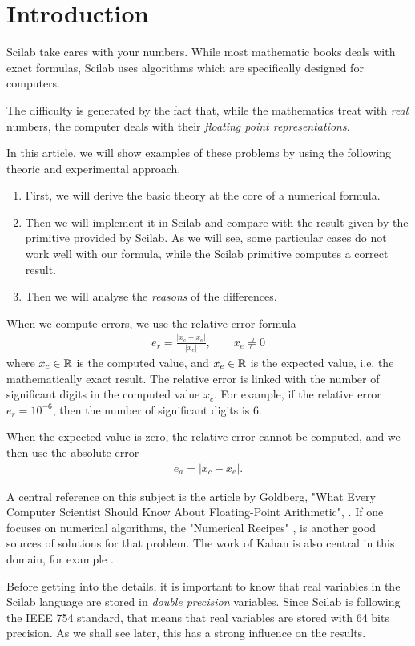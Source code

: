 \section{Introduction}

Scilab take cares with your numbers.
While most mathematic books deals with exact formulas, 
Scilab uses algorithms which are specifically designed for 
computers.

The difficulty is generated by the fact that, while 
the mathematics treat with \emph{real} numbers, the 
computer deals with their \emph{floating point representations}.

In this article, we will show examples of these problems by 
using the following theoric and experimental approach.
\begin{enumerate}
\item First, we will derive the basic theory at the core of a numerical
formula. 
\item Then we will implement it in Scilab and compare with the 
result given by the primitive provided by Scilab.
As we will see, some particular cases do not work well
with our formula, while the Scilab primitive computes a correct
result.
\item Then we will analyse the \emph{reasons} of the differences.
\end{enumerate}

When we compute errors, we use the relative error formula
\begin{eqnarray}
e_r=\frac{|x_c-x_e|}{|x_e|}, \qquad x_e\neq 0
\end{eqnarray}
where $x_c\in\mathbb{R}$ is the computed value, and $x_e\in\mathbb{R}$ is the 
expected value, i.e. the mathematically exact result.
The relative error is linked with the number of significant 
digits in the computed value $x_c$. For example, if the relative 
error $e_r=10^{-6}$, then the number of significant digits is 6.

When the expected value is zero, the relative error cannot 
be computed, and we then use the absolute error 
\begin{eqnarray}
e_a=|x_c-x_e|.
\end{eqnarray}

A central reference on this subject is the article 
by Goldberg, "What Every Computer Scientist Should Know About Floating-Point Arithmetic", 
\cite{WhatEveryComputerScientist}.
If one focuses on numerical algorithms, the "Numerical Recipes" \cite{NumericalRecipes},
is another good sources of solutions for that problem.
The work of Kahan is also central in this domain, for example \cite{Kahan2004}.

Before getting into the details, it is important to 
know that real variables in the Scilab language are stored in 
\emph{double precision} variables. Since Scilab is 
following the IEEE 754 standard, that means that real 
variables are stored with 64 bits precision.
As we shall see later, this has a strong influence on the 
results.

